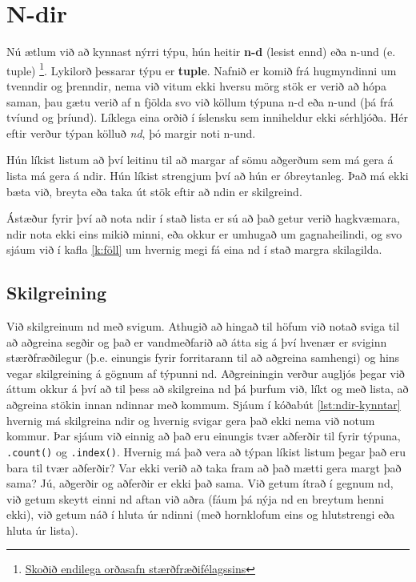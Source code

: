 
\chapter{N-dir}\label{k:ndir}
Nú ætlum við að kynnast nýrri týpu, hún heitir \textbf{n-d} (lesist ennd) eða n-und (e. tuple) \footnote{\href{http://stæ.is/os}{Skoðið endilega orðasafn stærðfræðifélagssins}}.
Lykilorð þessarar týpu er \textbf{tuple}.
Nafnið er komið frá hugmyndinni um tvenndir og þrenndir, nema við vitum ekki hversu mörg stök er verið að hópa saman, þau gætu verið af n fjölda svo við köllum týpuna n-d eða n-und (þá frá tvíund og þríund).
Líklega eina orðið í íslensku sem inniheldur ekki sérhljóða.
Hér eftir verður týpan kölluð \emph{nd}, þó margir noti n-und.
 
Hún líkist listum að því leitinu til að margar af sömu aðgerðum sem má gera á lista má gera á ndir.
Hún líkist strengjum því að hún er óbreytanleg.
Það má ekki bæta við, breyta eða taka út stök eftir að ndin er skilgreind.

Ástæður fyrir því að nota ndir í stað lista er sú að það getur verið hagkvæmara, ndir nota ekki eins mikið minni, eða okkur er umhugað um gagnaheilindi, og svo sjáum við í kafla \ref{k:föll} um hvernig megi fá eina nd í stað margra skilagilda.

\section{Skilgreining}
Við skilgreinum nd með svigum.
Athugið að hingað til höfum við notað sviga til að aðgreina segðir og það er vandmeðfarið að átta sig á því hvenær er sviginn stærðfræðilegur (þ.e. einungis fyrir forritarann til að aðgreina samhengi) og hins vegar skilgreining á gögnum af týpunni nd.
Aðgreiningin verður augljós þegar við áttum okkur á því að til þess að skilgreina nd þá þurfum við, líkt og með lista, að aðgreina stökin innan ndinnar með kommum.
Sjáum í kóðabút \ref{lst:ndir-kynntar} hvernig má skilgreina ndir og hvernig svigar gera það ekki nema við notum kommur.
Þar sjáum við einnig að það eru einungis tvær aðferðir til fyrir týpuna, \texttt{.count()} og \texttt{.index()}.
Hvernig má það vera að týpan líkist listum þegar það eru bara til tvær aðferðir?
Var ekki verið að taka fram að það mætti gera margt það sama?
Jú, aðgerðir og aðferðir er ekki það sama.
Við getum ítrað í gegnum nd, við getum skeytt einni nd aftan við aðra (fáum þá nýja nd en breytum henni ekki), við getum náð í hluta úr ndinni (með hornklofum eins og hlutstrengi eða hluta úr lista).

